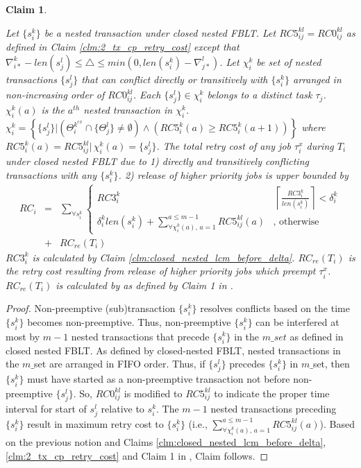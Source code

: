\documentclass[preprint]{sigplanconf}
\newtheorem{clm}{Claim}
\begin{document}
%
\begin{clm}\label{clm:closed_nested_fblt_final}

Let $\{s_{i}^{k}\}$ be a nested transaction under closed nested FBLT.
Let $RC5_{ij}^{kl}=RC0_{ij}^{kl}$ as defined in Claim \ref{clm:2_tx_cp_retry_cost}
except that $\nabla_{i*}^{k}-len\left(s_{j}^{l}\right)\le\triangle\le min\left(0,len\left(s_{i}^{k}\right)-\nabla_{j*}^{l}\right)$.
Let $\chi_{i}^{k}$ be set of nested transactions $\{s_{j}^{l}\}$
that can conflict directly or transitively with $\{s_{i}^{k}\}$ arranged
in non-increasing order of $RC0_{ij}^{kl}$. Each $\{s_{j}^{l}\}\in\chi_{i}^{k}$
belongs to a distinct task $\tau_{j}$. $\chi_{i}^{k}(a)$ is the
$a^{th}$ nested transaction in $\chi_{i}^{k}$. $\chi_{i}^{k}=\left\{ \{s_{j}^{l}\}|\left(\Theta_{i}^{k^{ex}}\cap\{\Theta_{j}^{l}\}\neq\emptyset\right)\wedge\left(RC5_{i}^{k}(a)\ge RC5_{i}^{k}(a+1)\right)\right\} $
where $RC5_{i}^{k}(a)=RC5_{ij}^{kl}|\,\chi_{i}^{k}(a)=\{s_{j}^{l}\}$.
The total retry cost of any job $\tau_{i}^{x}$ during $T_{i}$ under
closed nested FBLT due to 1) directly and transitively conflicting
transactions with any $\{s_{i}^{k}\}$. 2) release of higher priority
jobs is upper bounded by 
\begin{eqnarray}
RC_{i} & = & \sum_{\forall s_{i}^{k}}\begin{cases}
RC3_{i}^{k} & \,\left\lceil \frac{RC3_{i}^{k}}{len\left(s_{i}^{k}\right)}\right\rceil <\delta_{i}^{k}\\
\delta_{i}^{k}len\left(s_{i}^{k}\right)+\sum_{\forall\chi_{i}^{k}(a),\, a=1}^{a\le m-1}RC5_{ij}^{kl}(a) & \mbox{, otherwise}
\end{cases}\nonumber \\
 & + & RC_{re}(T_{i})\label{eq:closed_nested_fblt_after_delta}
\end{eqnarray}
$RC3_{i}^{k}$ is calculated by Claim \ref{clm:closed_nested_lcm_before_delta}.
$RC_{re}(T_{i})$ is the retry cost resulting from release of higher
priority jobs which preempt $\tau_{i}^{x}$. $RC_{re}(T_{i})$ is
calculated by as defined by Claim 1 in \cite{fblt}.

\end{clm}
%
\begin{proof}

Non-preemptive (sub)transaction $\{s_{i}^{k}\}$ resolves conflicts
based on the time $\{s_{i}^{k}\}$ becomes non-preemptive. Thus, non-preemptive
$\{s_{i}^{k}\}$ can be interfered at most by $m-1$ nested transactions
that precede $\{s_{i}^{k}\}$ in the $m\_set$ as defined in closed
nested FBLT. As defined by closed-nested FBLT, nested transactions
in the $m\_$set are arranged in FIFO order. Thus, if $\{s_{j}^{l}\}$
precedes $\{s_{i}^{k}\}$ in $m\_$set, then $\{s_{i}^{k}\}$ must
have started as a non-preemptive transaction not before non-preemptive
$\{s_{j}^{l}\}$. So, $RC0_{ij}^{kl}$ is modified to $RC5_{ij}^{kl}$
to indicate the proper time interval for start of $s_{j}^{l}$ relative
to $s_{i}^{k}$. The $m-1$ nested transactions preceding $\{s_{i}^{k}\}$
result in maximum retry cost to $\{s_{i}^{k}\}$ (i.e., $\sum_{\forall\chi_{i}^{k}(a),\, a=1}^{a\le m-1}RC5_{ij}^{kl}(a)$).
Based on the previous notion and Claims \ref{clm:closed_nested_lcm_before_delta},
\ref{clm:2_tx_cp_retry_cost} and Claim 1 in \cite{fblt}, Claim
follows.
%
\end{proof}
\end{document}
